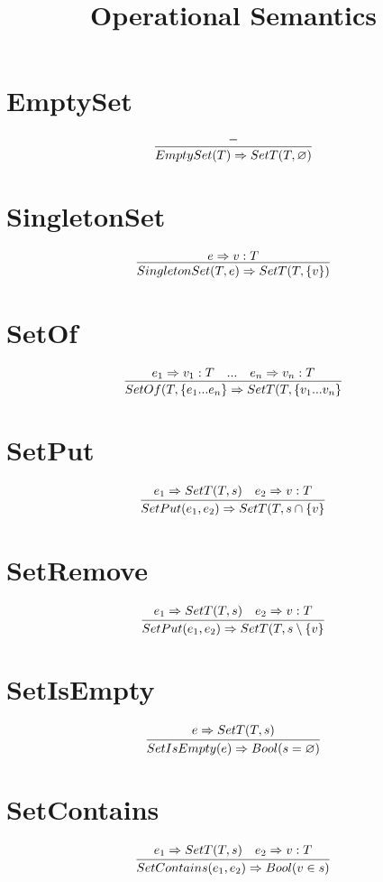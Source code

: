 \documentclass{article}
\title{Operational Semantics}
\begin{document}
\section{EmptySet}
\begin{equation*}
	\infer{EmptySet(T) \Rightarrow SetT(T, \varnothing)}{-}
\end{equation*}
\section{SingletonSet}
\begin{equation*}
	\infer{SingletonSet(T, e) \Rightarrow SetT(T, \{v\})}{e \Rightarrow v:T}
\end{equation*}
\section{SetOf}
\begin{equation*}
	\infer{SetOf(T, \{e_1...e_n\} \Rightarrow SetT(T, \{v_1...v_n\}}{e_1 \Rightarrow v_1:T & ... & e_n \Rightarrow v_n:T}
\end{equation*}
\section{SetPut}
\begin{equation*}
	\infer{SetPut(e_1, e_2) \Rightarrow SetT(T, s \cap \{v\}}{e_1 \Rightarrow SetT(T, s) & e_2 \Rightarrow v:T}
\end{equation*}
\section{SetRemove}
\begin{equation*}
	\infer{SetPut(e_1, e_2) \Rightarrow SetT(T, s \setminus \{v\}}{e_1 \Rightarrow SetT(T, s) & e_2 \Rightarrow v:T}
\end{equation*}
\section{SetIsEmpty}
\begin{equation*}
	\infer{SetIsEmpty(e) \Rightarrow Bool(s = \varnothing)}{e \Rightarrow SetT(T, s)}
\end{equation*}
\section{SetContains}
\begin{equation*}
	\infer{SetContains(e_1, e_2) \Rightarrow Bool(v \in s)}{e_1 \Rightarrow SetT(T, s) & e_2 \Rightarrow v:T}
\end{equation*}
\end{document}
